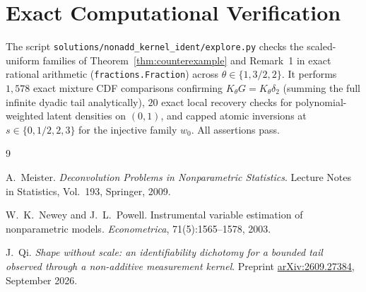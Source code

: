 \documentclass[11pt]{article}
\theoremstyle{plain}
\theoremstyle{definition}
\theoremstyle{remark}
\begin{document}
\section{Exact Computational Verification}

The script \texttt{solutions/nonadd\_kernel\_ident/explore.py} checks the scaled-uniform families of Theorem~\ref{thm:counterexample} and Remark~1 in exact rational arithmetic (\texttt{fractions.Fraction}) across $\theta \in \{1, 3/2, 2\}$.
It performs $1{,}578$ exact mixture CDF comparisons confirming $K_\theta G = K_\theta \delta_2$ (summing the full infinite dyadic tail analytically), $20$ exact local recovery checks for polynomial-weighted latent densities on $(0, 1)$, and capped atomic inversions at $s \in \{0, 1/2, 2, 3\}$ for the injective family $w_0$. All assertions pass.

\begin{thebibliography}{9}

A.~Meister.
\emph{Deconvolution Problems in Nonparametric Statistics}.
Lecture Notes in Statistics, Vol.~193, Springer, 2009.

W.~K.~Newey and J.~L.~Powell.
Instrumental variable estimation of nonparametric models.
\emph{Econometrica}, 71(5):1565--1578, 2003.

J.~Qi.
\emph{Shape without scale: an identifiability dichotomy for a bounded tail observed through a non-additive measurement kernel}.
Preprint \href{https://arxiv.org/abs/2609.27384}{arXiv:2609.27384}, September 2026.

\end{thebibliography}
\end{document}
